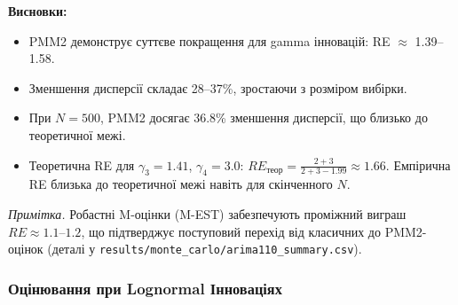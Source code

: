 \documentclass[12pt,a4paper]{article}
\begin{document}
\textbf{Висновки:}
\begin{itemize}
    \item PMM2 демонструє суттєве покращення для gamma інновацій: RE $\approx$ 1.39--1.58.
    \item Зменшення дисперсії складає 28--37\%, зростаючи з розміром вибірки.
    \item При $N = 500$, PMM2 досягає 36.8\% зменшення дисперсії, що близько до теоретичної межі.
    \item Теоретична RE для $\gamma_3 = 1.41$, $\gamma_4 = 3.0$: $RE_{\text{теор}} = \frac{2+3}{2+3-1.99} \approx 1.66$. Емпірична RE близька до теоретичної межі навіть для скінченного $N$.
\end{itemize}

\noindent\textit{Примітка.} Робастні M-оцінки (M-EST) забезпечують проміжний виграш $RE \approx 1.1$--$1.2$, що підтверджує поступовий перехід від класичних до PMM2-оцінок (деталі у \texttt{results/monte\_carlo/arima110\_summary.csv}).

\subsubsection{Оцінювання при Lognormal Інноваціях}
\end{document}
